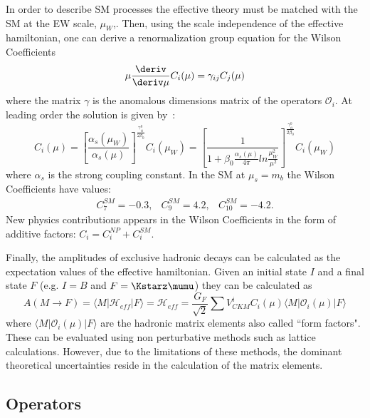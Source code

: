 In order to describe SM processes the effective theory must be matched
with the SM at the EW scale, $\mu_W$,. Then, using the scale independence of the
effective hamiltonian, one can derive a renormalization group equation for the Wilson Coefficients
%
\begin{equation}
\mu \frac{\deriv}{\deriv \mu} C_i(\mu) = \gamma_{ij}C_j(\mu)
\end{equation}
%
where the matrix $\gamma$ is the anomalous dimensions matrix of the operators $\mathcal{O}_i$.
At leading order the solution is given by~\cite{Buras:1998raa}:
%
\begin{equation}
C_i(\mu) = \left[ \frac{\alpha_s(\mu_W)}{\alpha_s(\mu)}\right]^{\frac{\gamma^0_{ii}}{2\beta_0}} C_i(\mu_W) = \left[ \frac{1}{1 + \beta_0\frac{\alpha_s(\mu)}{4\pi}ln\frac{\mu_W^2}{\mu^2}} \right]^{\frac{\gamma^0_{ii}}{2\beta_0}} C_i(\mu_W)
\end{equation}
%
where $\alpha_s$ is the strong coupling constant. In the SM at $\mu_s = m_b$ the
Wilson Coefficients have values:
%
\begin{equation}
\begin{array}{ccc}
C_7^{SM} = -0.3, & C_9^{SM} = 4.2, & C_{10}^{SM} = -4.2.
\end{array}
\end{equation}
%
New physics contributions appears in the Wilson Coefficients in the form of additive factors:
 $C_i = C_i^{NP} + C_i^{SM}$.

Finally, the amplitudes of exclusive hadronic decays can be calculated as the expectation 
values of the effective hamiltonian. Given an initial state $I$ and a final state $F$
(e.g. $I = B$ and $F=\Kstarz\mumu$) they can be calculated as
%
\begin{equation}
A(M\to F)= \langle M | \mathcal{H}_{eff} | F \rangle = 
\mathcal{H}_{eff} = \frac{G_F}{\sqrt{2}} \sum V_{CKM}^i C_i(\mu) \langle M | \mathcal{O}_i(\mu) | F \rangle
\end{equation}
where $\langle M | \mathcal{O}_i(\mu) | F \rangle$ are the hadronic matrix elements also called  ``form factors".
These can be evaluated using non perturbative methods such as lattice calculations.
However, due to the limitations of these methods, the dominant theoretical uncertainties
reside in the calculation of the matrix elements.

\subsection{Operators}
\label{sec:operators}

